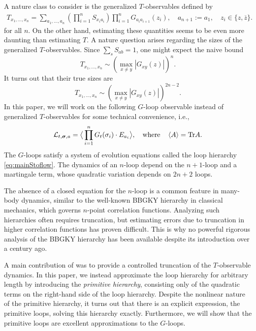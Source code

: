 \documentclass[10pt,reqno]{article}
\renewcommand{\bar}{\overline}
\theoremstyle{plain} %
\theoremstyle{remark}
\numberwithin{equation}{section}
\begin{document}
A nature class to consider is the generalized \( T \)-observables defined by   
\begin{align}\label{gt}
T_{x_1, \dots, x_n} = \sum_{a_1, \dots, a_n} \left( \prod_{i=1}^n S_{x_i a_i} \right) \prod_{i=1}^n G_{a_i a_{i+1}}(z_i), \quad a_{n+1} := a_1, \quad z_i \in \{z, \bar{z}\}.
\end{align} 
for all $n$. On the other hand, estimating these quantities seems to be even more daunting than  estimating \( T \). 
A nature question arises regarding the sizes of the generalized \( T \)-observables.  
 Since \( \sum_s S_{ab} = 1 \), one might expect the naive bound 
\[
T_{x_1, \dots, x_n} \sim  ( \max_{x \ne y} |G_{xy}(z)|  )^n.
\] 
 It turns out that their  true sizes are
\[
T_{x_1, \dots, x_n} \sim  ( \max_{x \ne y} |G_{xy}(z)| )^{2n-2}.
\]  
In this paper, we will work on the following \( G \)-loop observable instead of  generalized \( T \)-observables for some technical convenience, i.e., 
\[
{\cal L}_{t, \boldsymbol{\sigma}, \textbf{a}} = \big \langle \prod_{i=1}^n G_t(\sigma_i) \cdot E_{a_i} \big\rangle, \quad \text{where} \quad \left\langle A \right\rangle = \text{Tr} A.
\]
The \( G \)-loops satisfy a system of  evolution equations called the loop hierarchy  \eqref{eq:mainStoflow}. The dynamics of an \( n \)-loop depend on the \( n+1 \)-loop and a martingale term, whose quadratic variation depends on \( 2n+2 \) loops.

The absence of a closed equation for the \( n \)-loop is a common feature in many-body dynamics, similar to the well-known BBGKY hierarchy in classical mechanics, which governs \( n \)-point correlation functions. Analyzing such hierarchies often requires truncation, but estimating errors due to truncation in higher correlation functions has proven difficult. This is why no powerful rigorous analysis of the BBGKY hierarchy has been available despite its introduction over a century ago.

A main contribution of \cite{DY} was to provide a controlled truncation of the \( T \)-observable dynamics. In this paper, we instead approximate the loop hierarchy for arbitrary length by introducing the \textit{primitive hierarchy},  consisting  only of the quadratic terms on the right-hand side of the loop hierarchy. Despite the nonlinear nature of the primitive hierarchy, it turns out that there is an explicit expression, the primitive loops,  solving this hierarchy exactly.  Furthermore, we will show that the primitive loops are excellent approximations to  the \( G \)-loops. 
\end{document}

